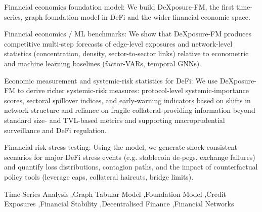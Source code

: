 \documentclass[preprint,12pt]{elsarticle}
\begin{document}
\begin{frontmatter}
\begin{abstract}


\end{abstract}


\begin{highlights}
\item Financial economics foundation model: We build DeXposure-FM, the first time-series, graph foundation model in DeFi and the wider financial economic space.

\item Financial economics / ML benchmarks: We show that DeXposure-FM produces competitive multi-step forecasts of edge-level exposures and network-level statistics (concentration, density, sector-to-sector links) relative to econometric and machine learning baselines (factor-VARs, temporal GNNs).

\item Economic measurement and systemic-risk statistics for DeFi: We use DeXposure-FM to derive richer systemic-risk measures: protocol-level systemic-importance scores, sectoral spillover indices, and early-warning indicators based on shifts in network structure and reliance on fragile collateral-providing information beyond standard size- and TVL-based metrics and supporting macroprudential surveillance and DeFi regulation.

\item Financial risk stress testing: Using the model, we generate shock-consistent scenarios for major DeFi stress events (e.g. stablecoin de-pegs, exchange failures) and quantify loss distributions, contagion paths, and the impact of counterfactual policy tools (leverage caps, collateral haircuts, bridge limits).
\end{highlights}

\begin{keyword}
Time-Series Analysis \sep Graph Tabular Model \sep Foundation Model \sep Credit Exposures \sep Financial Stability \sep Decentralised Finance \sep Financial Networks





\end{keyword}

\end{frontmatter}
\end{document}
